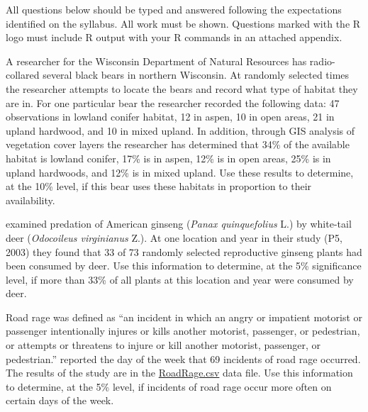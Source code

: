 \documentclass[10pt,openany]{book}\usepackage[]{graphicx}\usepackage[]{color}
\begin{document}
\newpage
\begin{hwsection}{All questions below should be typed and answered following the expectations identified on the syllabus.  All work must be shown.  Questions marked with the R logo must include R output with your R commands in an attached appendix.}

  \item \label{hwprob:ChiGOFBear1} A researcher for the Wisconsin Department of Natural Resources has radio-collared several black bears in northern Wisconsin.  At randomly selected times the researcher attempts to locate the bears and record what type of habitat they are in.  For one particular bear the researcher recorded the following data: 47 observations in lowland conifer habitat, 12 in aspen, 10 in open areas, 21 in upland hardwood, and 10 in mixed upland.  In addition, through GIS analysis of vegetation cover layers the researcher has determined that 34\% of the available habitat is lowland conifer, 17\% is in aspen, 12\% is in open areas, 25\% is in upland hardwoods, and 12\% is in mixed upland.  Use these results to determine, at the 10\% level, if this bear uses these habitats in proportion to their availability.

  \item \label{hwprob:ChiGOFDeerGinseng} \rhw{} \cite{FurediMcGraw2004} examined predation of American ginseng (\textit{Panax quinquefolius} L.) by white-tail deer (\textit{Odocoileus virginianus} Z.).  At one location and year in their study (P5, 2003) they found that 33 of 73 randomly selected reproductive ginseng plants had been consumed by deer.  Use this information to determine, at the 5\% significance level, if more than 33\% of all plants at this location and year were consumed by deer.

  \item \label{hwprob:chiRoadRage} \rhw{} Road rage was defined as ``an incident in which an angry or impatient motorist or passenger intentionally injures or kills another motorist, passenger, or pedestrian, or attempts or threatens to injure or kill another motorist, passenger, or pedestrian.''  \cite{RathboneHuckabee1999} reported the day of the week that 69 incidents of road rage occurred.  The results of the study are in the \href{https://raw.githubusercontent.com/droglenc/NCData/master/RoadRage.csv}{RoadRage.csv} data file.  Use this information to determine, at the 5\% level, if incidents of road rage occur more often on certain days of the week.


\end{hwsection}
\end{document}

